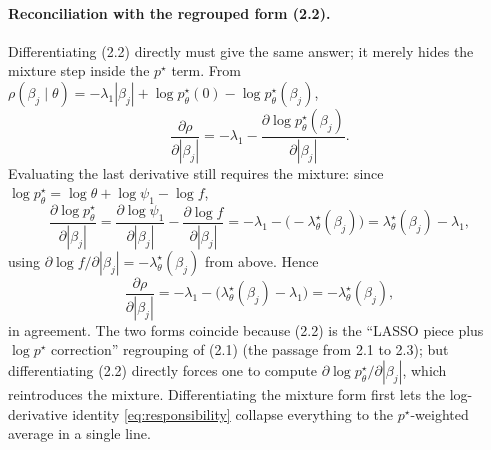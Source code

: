 \documentclass[11pt]{article}
\newcommand{\pstar}{p^{\star}}
\newcommand{\lstar}{\lambda^{\star}}
\begin{document}
\paragraph{Reconciliation with the regrouped form (2.2).}
Differentiating (2.2) directly must give the same answer; it merely hides the
mixture step inside the $\pstar$ term. From
$\rho(\beta_j\mid\theta) = -\lambda_1|\beta_j| + \log\pstar_\theta(0)
- \log\pstar_\theta(\beta_j)$,
\begin{equation*}
  \frac{\partial\rho}{\partial|\beta_j|}
  = -\lambda_1 - \frac{\partial\log\pstar_\theta(\beta_j)}{\partial|\beta_j|}.
\end{equation*}
Evaluating the last derivative still requires the mixture: since
$\log\pstar_\theta = \log\theta + \log\psi_1 - \log f$,
\begin{equation*}
  \frac{\partial\log\pstar_\theta}{\partial|\beta_j|}
  = \frac{\partial\log\psi_1}{\partial|\beta_j|}
    - \frac{\partial\log f}{\partial|\beta_j|}
  = -\lambda_1 - \bigl(-\lstar_\theta(\beta_j)\bigr)
  = \lstar_\theta(\beta_j) - \lambda_1,
\end{equation*}
using $\partial\log f/\partial|\beta_j| = -\lstar_\theta(\beta_j)$ from above.
Hence
\begin{equation*}
  \frac{\partial\rho}{\partial|\beta_j|}
  = -\lambda_1 - \bigl(\lstar_\theta(\beta_j)-\lambda_1\bigr)
  = -\lstar_\theta(\beta_j),
\end{equation*}
in agreement. The two forms coincide because (2.2) is the ``LASSO piece plus
$\log\pstar$ correction'' regrouping of (2.1) (the passage from 2.1 to 2.3);
but differentiating (2.2) directly forces one to compute
$\partial\log\pstar_\theta/\partial|\beta_j|$, which reintroduces the mixture.
Differentiating the mixture form first lets the log-derivative identity
\eqref{eq:responsibility} collapse everything to the $\pstar$-weighted average
in a single line.
\end{document}
